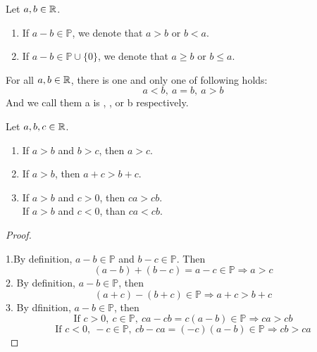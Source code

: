 \documentclass[a4paper,12pt]{article}
\begin{document}
\begin{definition}
    Let \(a,b\in\mathbb{R}\).
    \begin{enumerate}
        \item If \(a-b\in\mathbb{P}\), we denote that \(a>b\) or \(b<a\).
        \item If \(a-b\in\mathbb{P}\cup\{0\}\), we denote that \(a\ge b\) or \(b\le a\).
    \end{enumerate}
     For all \(a,b\in\mathbb{R}\), there is one and only one of following holds:
    \[a<b,\ a=b,\ a>b\]
    And we call them a is , , or  b respectively.\\
\end{definition}

\begin{theorem} Let \(a,b,c\in\mathbb{R}\).
    \begin{enumerate}
        \item If \(a>b\) and \(b>c\), then \(a>c\).
        \item If \(a>b\), then \(a+c>b+c\).
        \item If \(a>b\) and \(c>0\), then \(ca>cb\).\\If \(a>b\) and \(c<0\), than \(ca<cb\).
    \end{enumerate}
    \begin{proof}\ 

        1.By definition, \(a-b\in\mathbb{P}\) and \(b-c\in\mathbb{P}\). Then
        \[(a-b)+(b-c)=a-c\in\mathbb{P}\Rightarrow a>c\]
        2. By definition, \(a-b\in\mathbb{P}\), then 
        \[(a+c)-(b+c)\in\mathbb{P}\Rightarrow a+c>b+c\]
        3. By dfinition, \(a-b\in\mathbb{P}\), then 
        \[\text{If }c>0,\ c\in\mathbb{P},\ ca-cb=c(a-b)\in\mathbb{P}\Rightarrow ca>cb\]
        \[\text{If }c<0,\ -c\in\mathbb{P},\ cb-ca=(-c)(a-b)\in\mathbb{P}\Rightarrow cb>ca\]
    \end{proof}
\end{theorem}

\newpage
\end{document}
